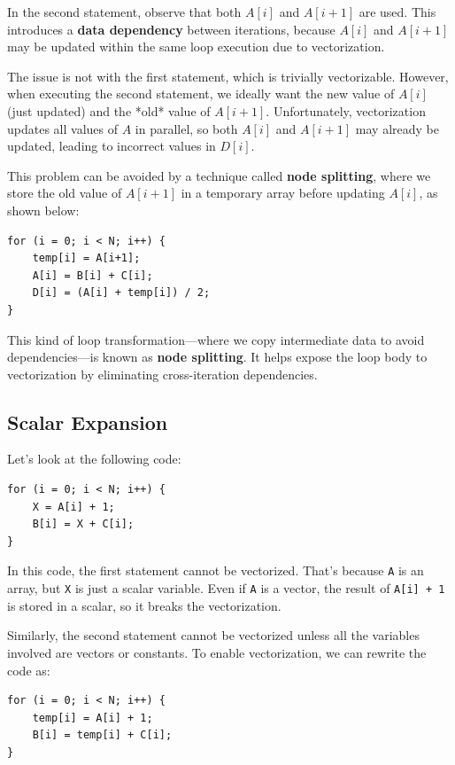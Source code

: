 \documentclass[12pt]{book}
\begin{document}
In the second statement, observe that both \( A[i] \) and \( A[i+1] \) are used. This introduces a \textbf{data dependency} between iterations, because \( A[i] \) and \( A[i+1] \) may be updated within the same loop execution due to vectorization. 

The issue is not with the first statement, which is trivially vectorizable. However, when executing the second statement, we ideally want the new value of \( A[i] \) (just updated) and the *old* value of \( A[i+1] \). Unfortunately, vectorization updates all values of \( A \) in parallel, so both \( A[i] \) and \( A[i+1] \) may already be updated, leading to incorrect values in \( D[i] \).

This problem can be avoided by a technique called \textbf{node splitting}, where we store the old value of \( A[i+1] \) in a temporary array before updating \( A[i] \), as shown below:

\begin{lstlisting}[style=cppstyle]
for (i = 0; i < N; i++) {
    temp[i] = A[i+1];
    A[i] = B[i] + C[i];
    D[i] = (A[i] + temp[i]) / 2;
}
\end{lstlisting}

This kind of loop transformation—where we copy intermediate data to avoid dependencies—is known as \textbf{node splitting}. It helps expose the loop body to vectorization by eliminating cross-iteration dependencies.

\subsection{Scalar Expansion}
Let’s look at the following code:
\begin{lstlisting}[style=cppstyle]
for (i = 0; i < N; i++) {
    X = A[i] + 1;
    B[i] = X + C[i];
}
\end{lstlisting}

In this code, the first statement cannot be vectorized. That’s because \texttt{A} is an array, but \texttt{X} is just a scalar variable. Even if \texttt{A} is a vector, the result of \texttt{A[i] + 1} is stored in a scalar, so it breaks the vectorization.

Similarly, the second statement cannot be vectorized unless all the variables involved are vectors or constants. To enable vectorization, we can rewrite the code as:

\begin{lstlisting}[style=cppstyle]
for (i = 0; i < N; i++) {
    temp[i] = A[i] + 1;
    B[i] = temp[i] + C[i];
}
\end{lstlisting}
\end{document}
